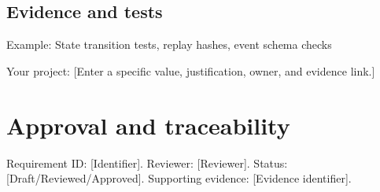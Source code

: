 \documentclass[11pt]{article}
\begin{document}
\subsection{Evidence and tests}
Example: State transition tests, replay hashes, event schema checks

Your project: [Enter a specific value, justification, owner, and evidence link.]


\section{Approval and traceability}
Requirement ID: [Identifier]. Reviewer: [Reviewer]. Status: [Draft/Reviewed/Approved]. Supporting evidence: [Evidence identifier].
\end{document}
